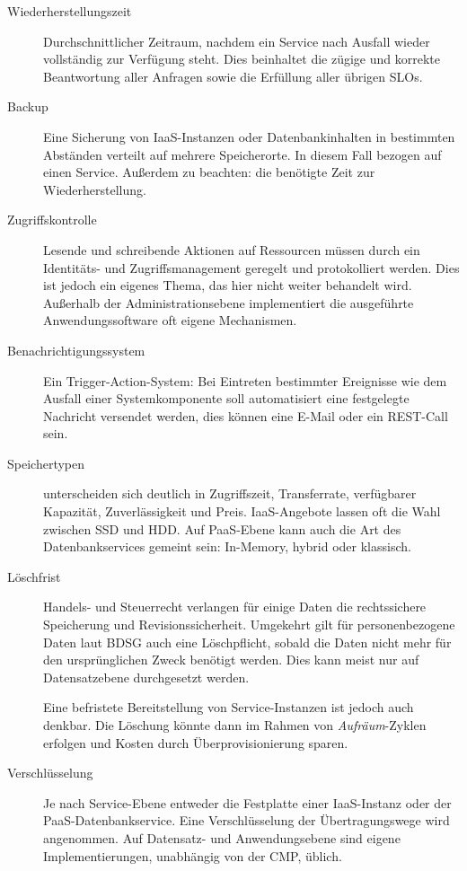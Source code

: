 \begin{description}
	\item[Wiederherstellungszeit] Durchschnittlicher Zeitraum, nachdem ein Service nach Ausfall wieder vollständig zur Verfügung steht. Dies beinhaltet die zügige und korrekte Beantwortung aller Anfragen sowie die Erfüllung aller übrigen SLOs.
	
	\item[Backup] Eine Sicherung von IaaS-Instanzen oder Datenbankinhalten in bestimmten Abständen verteilt auf mehrere Speicherorte. In diesem Fall bezogen auf einen Service. Außerdem zu beachten: die benötigte Zeit zur Wiederherstellung.
	
	\item[Zugriffskontrolle] Lesende und schreibende Aktionen auf Ressourcen müssen durch ein Identitäts- und Zugriffsmanagement geregelt und protokolliert werden. Dies ist jedoch ein eigenes Thema, das hier nicht weiter behandelt wird. Außerhalb der Administrationsebene implementiert die ausgeführte Anwendungssoftware oft eigene Mechanismen.
	
	\item[Benachrichtigungssystem] Ein Trigger-Action-System: Bei Eintreten bestimmter Ereignisse wie dem Ausfall einer Systemkomponente soll automatisiert eine festgelegte Nachricht versendet werden, dies können eine E-Mail oder ein REST-Call sein.
	
	\item[Speichertypen] unterscheiden sich deutlich in Zugriffszeit, Transferrate, verfügbarer Kapazität, Zuverlässigkeit und Preis. IaaS-Angebote lassen oft die Wahl zwischen SSD und HDD. Auf PaaS-Ebene kann auch die Art des Datenbankservices gemeint sein: In-Memory, hybrid oder klassisch.
	
	\item[Löschfrist] Handels- und Steuerrecht verlangen für einige Daten die rechtssichere Speicherung und Revisionssicherheit. Umgekehrt gilt für personenbezogene Daten laut BDSG auch eine Löschpflicht, sobald die Daten nicht mehr für den ursprünglichen Zweck benötigt werden. Dies kann meist nur auf Datensatzebene durchgesetzt werden.
	
	Eine befristete Bereitstellung von Service-Instanzen ist jedoch auch denkbar. Die Löschung könnte dann im Rahmen von \emph{Aufräum}-Zyklen erfolgen und Kosten durch Überprovisionierung sparen.
	
	\item[Verschlüsselung] Je nach Service-Ebene entweder die Festplatte einer IaaS-Instanz oder der PaaS-Datenbankservice. Eine Verschlüsselung der Übertragungswege wird angenommen. Auf Datensatz- und Anwendungsebene sind eigene Implementierungen, unabhängig von der CMP, üblich.
	

\end{description}
